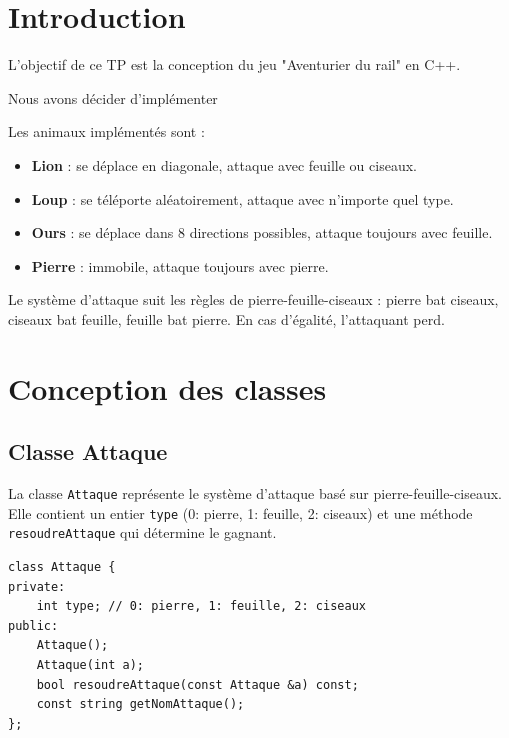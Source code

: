 \documentclass[a4paper,12pt,french]{article}
\begin{document}
\thispagestyle{empty}
\tableofcontents
\pagebreak


\section{Introduction}

L'objectif de ce TP est la conception du jeu "Aventurier du rail" en C++. 

Nous avons décider d'implémenter 


Les animaux implémentés sont :
\begin{itemize}
  \item \textbf{Lion} : se déplace en diagonale, attaque avec feuille ou ciseaux.
  \item \textbf{Loup} : se téléporte aléatoirement, attaque avec n'importe quel type.
  \item \textbf{Ours} : se déplace dans 8 directions possibles, attaque toujours avec feuille.
  \item \textbf{Pierre} : immobile, attaque toujours avec pierre.
\end{itemize}

Le système d'attaque suit les règles de pierre-feuille-ciseaux : pierre bat ciseaux, ciseaux bat feuille, feuille bat pierre. En cas d'égalité, l'attaquant perd.


\pagebreak
\section{Conception des classes}

\subsection{Classe Attaque}

La classe \texttt{Attaque} représente le système d'attaque basé sur pierre-feuille-ciseaux. Elle contient un entier \texttt{type} (0: pierre, 1: feuille, 2: ciseaux) et une méthode \texttt{resoudreAttaque} qui détermine le gagnant.

\begin{verbatim}
class Attaque {
private:
    int type; // 0: pierre, 1: feuille, 2: ciseaux
public:
    Attaque();
    Attaque(int a);
    bool resoudreAttaque(const Attaque &a) const;
    const string getNomAttaque();
};
\end{verbatim}
\end{document}
